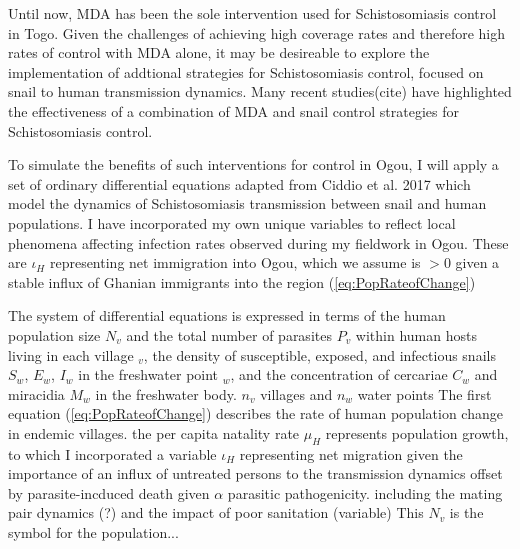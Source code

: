 \documentclass[12pt]{article}
\begin{document}

Until now, MDA has been the sole intervention used for Schistosomiasis control in Togo. Given the challenges of achieving high coverage rates and therefore high rates of control with MDA alone, it may be desireable to explore the implementation of addtional strategies for Schistosomiasis control, focused on snail to human transmission dynamics. Many recent studies(cite) have highlighted the effectiveness of a combination of MDA and snail control strategies for Schistosomiasis control. 

To simulate the benefits of such interventions for control in Ogou,  I will apply a set of ordinary differential equations adapted from Ciddio et al. 2017 which model the dynamics of Schistosomiasis transmission between snail and human populations. I have incorporated my own unique variables to reflect local phenomena affecting infection rates observed during my fieldwork in Ogou. These are $\iota_H$ representing net immigration into Ogou, which we assume is $>$0 given a stable influx of Ghanian immigrants into the region (\ref{eq:PopRateofChange}) %



The system of differential equations is expressed in terms of the human population size $N_v$ and the total number of parasites $P_v$ within human hosts living in each village $_v$, the density of susceptible, exposed, and infectious snails $S_w$, $E_w$, $I_w$ in the freshwater point $_w$, and the concentration of cercariae $C_w$ and miracidia $M_w$ in the freshwater body.
$n_v$ villages and $n_w$ water points
The first equation (\ref{eq:PopRateofChange}) describes the rate of human population change in endemic villages. the per capita natality rate $\mu_H$ represents population growth, to which I incorporated a variable $\iota_H$ representing net migration given the importance of an influx of untreated persons to the transmission dynamics
 offset by parasite-incduced death given $\alpha$ parasitic pathogenicity.
including the mating pair dynamics (?) and the impact of poor sanitation (variable)
This $N_v$ is the symbol for the population...
\end{document}
